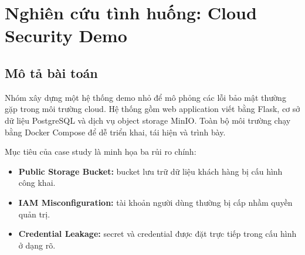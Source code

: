 \chapter{Nghiên cứu tình huống: Cloud Security Demo}

\section{Mô tả bài toán}
Nhóm xây dựng một hệ thống demo nhỏ để mô phỏng các lỗi bảo mật thường gặp trong môi trường cloud. Hệ thống gồm web application viết bằng Flask, cơ sở dữ liệu PostgreSQL và dịch vụ object storage MinIO. Toàn bộ môi trường chạy bằng Docker Compose để dễ triển khai, tái hiện và trình bày.

Mục tiêu của case study là minh họa ba rủi ro chính:
\begin{itemize}
    \item \textbf{Public Storage Bucket:} bucket lưu trữ dữ liệu khách hàng bị cấu hình công khai.
    \item \textbf{IAM Misconfiguration:} tài khoản người dùng thường bị cấp nhầm quyền quản trị.
    \item \textbf{Credential Leakage:} secret và credential được đặt trực tiếp trong cấu hình ở dạng rõ.
\end{itemize}

